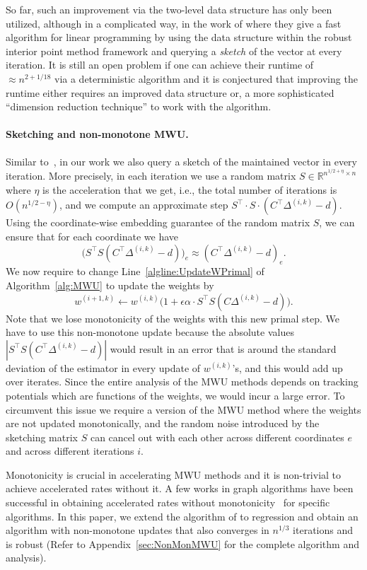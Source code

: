 \documentclass[11pt]{article}
\newcommand\dd{\boldsymbol{\mathit{d}}}
\newcommand\ww{\boldsymbol{\mathit{w}}}
\newcommand\CC{\boldsymbol{\mathit{C}}}
\renewcommand\SS{\boldsymbol{\mathit{S}}}
\newcommand\R{\mathbb{R}}
\begin{document}
So far, such an improvement via the two-level data structure has only been utilized, although in a complicated way, in the work of \textcite{jiang2021faster} where they give a fast algorithm for linear programming by using the data structure within the robust interior point method framework and querying a {\it sketch} of the vector at every iteration. It is still an open problem if one can achieve their runtime of $\approx n^{2+1/18}$ via a deterministic algorithm and it is conjectured that improving the runtime either requires an improved data structure or, a more sophisticated ``dimension reduction technique'' to work with the algorithm.  


\paragraph{Sketching and non-monotone MWU.} 
Similar to~\cite{jiang2021faster}, in our work we also query a sketch of the maintained vector in every iteration. More precisely, in each iteration we use a random matrix $\SS \in \R^{n^{1/2+\eta} \times n}$ where $\eta$ is the acceleration that we get, i.e., the total number of iterations is $O(n^{1/2-\eta})$, and we compute an approximate step
$\SS^{\top} \cdot \SS \cdot (\CC^{\top} \Delta^{(i,k)} - \dd)$. Using the coordinate-wise embedding guarantee of the random matrix $\SS$, we can ensure that for each coordinate we have
\[
\Big( \SS^{\top} \SS (\CC^{\top} \Delta^{(i,k)} - \dd) \Big)_e \approx (\CC^{\top} \Delta^{(i,k)} - \dd)_e.
\]
We now require to change Line~\ref{algline:UpdateWPrimal} of Algorithm~\ref{alg:MWU} to update the weights by 
\[
\ww^{(i+1,k)} \leftarrow \ww^{(i,k)} \Big(1 + \epsilon\alpha \cdot \SS^{\top} \SS (\CC\Delta^{(i,k)}-\dd) \Big).
\]
Note that we lose monotonicity of the weights with this new primal step. We have to use this non-monotone update because the absolute values $|\SS^{\top} \SS (\CC^{\top} \Delta^{(i,k)} - \dd)|$ would result in an error that is around the standard deviation of the estimator in every update of $\ww^{(i,k)}$'s, and this would add up over iterates. Since the entire analysis of the MWU methods depends on tracking potentials which are functions of the weights, we would incur a large error. To circumvent this issue we require a version of the MWU method where the weights are not updated monotonically, and the random noise introduced by the sketching matrix $\SS$ can cancel out with each other across different coordinates $e$ and across different iterations $i$.

Monotonicity is crucial in accelerating MWU methods and it is non-trivial to achieve accelerated rates without it. A few works in graph algorithms have been successful in obtaining accelerated rates without monotonicity~\cite{madry2016computing,liu2020faster} for specific algorithms. In this paper, we extend the algorithm of \textcite{madry2016computing} to regression and obtain an algorithm with non-monotone updates that also converges in $n^{1/3}$ iterations and is robust (Refer to Appendix~\ref{sec:NonMonMWU} for the complete algorithm and analysis). 
\end{document}
